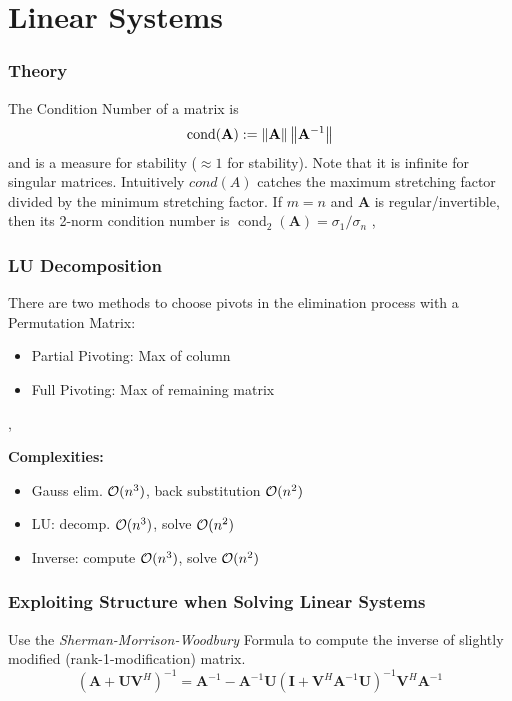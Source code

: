 \part{Linear Systems}
\setcounter{section}{0}

\section{Theory}
\Def The Condition Number of a matrix is $$\operatorname{cond}(\mathbf{A}):=\left\lVert \mathbf{A} \right\rVert\left\lVert \mathbf{A}^{-1} \right\rVert$$ and is a measure for stability ($\approx 1$ for stability).
Note that it is infinite for singular matrices.
Intuitively $cond(A)$ catches the maximum stretching factor divided by the minimum stretching factor.
\Lemma If $m=n$ and $\mathbf{A}$ is regular/invertible, then its 2-norm condition number is  $\operatorname{cond}_{2}(\mathbf{A})=\sigma_{1} / \sigma_{n}$
\sep

\section{LU Decomposition}

There are two methods to choose pivots in the elimination process with a Permutation Matrix:
\begin{itemize}
	\item Partial Pivoting: Max of column
	\item Full Pivoting: Max of remaining matrix
\end{itemize}
\sep

\textbf{Complexities:}
\begin{itemize}
	\item Gauss elim. $\mathcal{O}(n^3)$, back substitution $\mathcal{O}(n^2)$
  	\item LU: decomp. $\mathcal{O}(n^3)$, solve $\mathcal{O}(n^2)$
  	\item Inverse: compute $\mathcal{O}(n^3)$, solve $\mathcal{O}(n^2)$ 
\end{itemize}

\section{Exploiting Structure when Solving Linear Systems}

 Use the \textit{Sherman-Morrison-Woodbury}
Formula to compute the inverse of slightly modified (rank-1-modification) matrix.
$$
{\scriptstyle \left(\mathbf{A}+\mathbf{U V}^{H}\right)^{-1}=\mathbf{A}^{-1}-\mathbf{A}^{-1} \mathbf{U}\left(\mathbf{I}+\mathbf{V}^{H} \mathbf{A}^{-1} \mathbf{U}\right)^{-1} \mathbf{V}^{H} \mathbf{A}^{-1}
}$$

